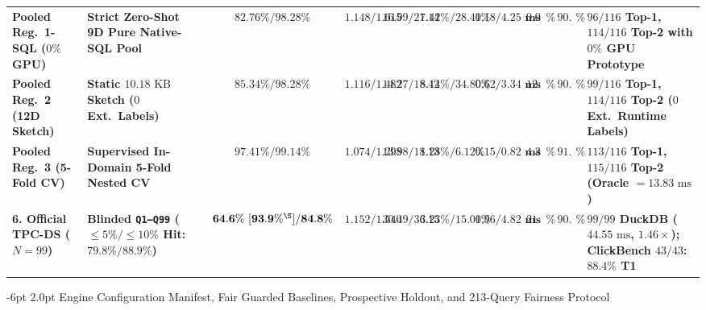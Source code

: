 \documentclass[10pt,a4paper]{article}
\makeatletter
\newenvironment{fitasttable}{%
  \begin{lrbox}{\asttblbox}%
}{%
  \end{lrbox}%
  \sbox{\asttblboxB}{%
    \ifdim\wd\asttblbox>0.96\textwidth
      \resizebox{0.96\textwidth}{!}{\usebox{\asttblbox}}%
    \else
      \usebox{\asttblbox}%
    \fi
  }%
  \ifdim\ht\asttblboxB>0.72\textheight
    \resizebox{!}{0.72\textheight}{\usebox{\asttblboxB}}%
  \else
    \usebox{\asttblboxB}%
  \fi
}
\renewcommand\subsubsection{\@startsection{subsubsection}{3}{\z@}%
  {-6pt \@plus -1.5pt \@minus -1pt}%
  {2.0pt \@plus 0.8pt}%
  {\normalfont\normalsize\bfseries}}
\makeatother
\begin{document}
\begin{table}[!htbp]
\begin{fitasttable}
\begin{tabular}{@{}llcccccccl@{}}
\textbf{Pooled Reg.\ 1-SQL ($0\%$ GPU)} & \textbf{Strict Zero-Shot 9D Pure Native-SQL Pool} & $\mathbf{82.76\% / 98.28\%}$ & $\mathbf{1.148 / 1.615}$ & $\mathbf{16.99 / 21.14}$ & $\mathbf{7.42\% / 28.40\%}$ & $\mathbf{1.18 / 4.25\text{ ms}}$ & $\mathbf{0.00\%}$ & $\mathbf{90.5\%}$ & \textbf{$96/116$ Top-1, $114/116$ Top-2 with $0\%$ GPU Prototype} \\
\textbf{Pooled Reg.\ 2 (12D Sketch)} & \textbf{Static $10.18\text{ KB}$ Sketch ($0$ Ext.\ Labels)} & $\mathbf{85.34\% / 98.28\%}$ & $\mathbf{1.116 / 1.482}$ & $\mathbf{14.27 / 18.42}$ & $\mathbf{8.14\% / 34.80\%}$ & $\mathbf{0.62 / 3.34\text{ ms}}$ & $\mathbf{12.93\%}$ & $\mathbf{90.5\%}$ & \textbf{$99/116$ Top-1, $114/116$ Top-2 ($0$ Ext.\ Runtime Labels)} \\
\textbf{Pooled Reg.\ 3 (5-Fold CV)} & \textbf{Supervised In-Domain 5-Fold Nested CV} & $\mathbf{97.41\% / 99.14\%}$ & $\mathbf{1.074 / 1.298}$ & $\mathbf{13.98 / 18.13}$ & $\mathbf{1.28\% / 6.12\%}$ & $\mathbf{0.15 / 0.82\text{ ms}}$ & $\mathbf{4.31\%}$ & $\mathbf{91.4\%}$ & \textbf{$113/116$ Top-1, $115/116$ Top-2 (Oracle $=13.83\text{ ms}$)} \\
\textbf{6. Official TPC-DS ($N=99$)} & \textbf{Blinded \texttt{Q1--Q99} ($\le 5\%/\le 10\%$ Hit: $\mathbf{79.8\%/88.9\%}$)} & $\mathbf{64.6\%\ [93.9\%^{\S}] / 84.8\%}$ & $\mathbf{1.152 / 1.540}$ & $\mathbf{30.49 / 36.15}$ & $\mathbf{3.23\% / 15.01\%}$ & $\mathbf{0.96 / 4.82\text{ ms}}$ & $\mathbf{21.2\%}$ & $\mathbf{90.9\%}$ & \textbf{$99/99$ DuckDB ($44.55\text{ ms}$, $\mathbf{1.46\times}$); ClickBench $43/43$: $\mathbf{88.4\%}$ T1} \\
\bottomrule
\end{tabular}
\end{fitasttable}%
\end{table}

\subsubsection{Engine Configuration Manifest, Fair Guarded Baselines, Prospective Holdout, and 213-Query Fairness Protocol}
\label{sec:v852_reviewer_audit}
\end{document}

